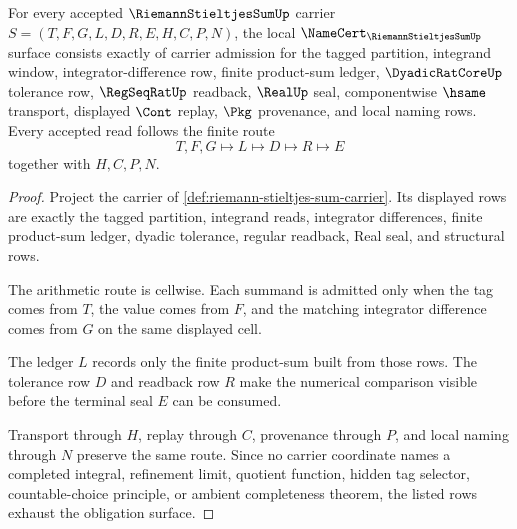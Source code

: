 \begin{theorem}
\label{thm:riemann-stieltjes-sum-namecert-obligations}
For every accepted $\RiemannStieltjesSumUp$ carrier $S=(T,F,G,L,D,R,E,H,C,P,N)$, the local $\NameCert_{\RiemannStieltjesSumUp}$ surface consists exactly of carrier admission for the tagged partition, integrand window, integrator-difference row, finite product-sum ledger, $\DyadicRatCoreUp$ tolerance row, $\RegSeqRatUp$ readback, $\RealUp$ seal, componentwise $\hsame$ transport, displayed $\Cont$ replay, $\Pkg$ provenance, and local naming rows. Every accepted read follows the finite route
$$
T,F,G \longmapsto L \longmapsto D \longmapsto R \longmapsto E
$$
together with $H,C,P,N$.
\end{theorem}
\begin{proof}
Project the carrier of \autoref{def:riemann-stieltjes-sum-carrier}. Its displayed rows are exactly the tagged partition, integrand reads, integrator differences, finite product-sum ledger, dyadic tolerance, regular readback, Real seal, and structural rows.

The arithmetic route is cellwise. Each summand is admitted only when the tag comes from $T$, the value comes from $F$, and the matching integrator difference comes from $G$ on the same displayed cell.

The ledger $L$ records only the finite product-sum built from those rows. The tolerance row $D$ and readback row $R$ make the numerical comparison visible before the terminal seal $E$ can be consumed.

Transport through $H$, replay through $C$, provenance through $P$, and local naming through $N$ preserve the same route. Since no carrier coordinate names a completed integral, refinement limit, quotient function, hidden tag selector, countable-choice principle, or ambient completeness theorem, the listed rows exhaust the obligation surface.
\end{proof}

